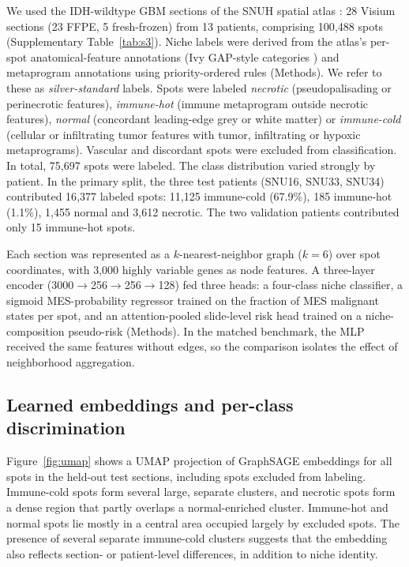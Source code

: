 \documentclass[11pt,letterpaper]{article}
\begin{document}
We used the IDH-wildtype GBM sections of the SNUH spatial atlas \cite{park2026}: 28 Visium sections (23 FFPE, 5 fresh-frozen) from 13 patients, comprising 100{,}488 spots (Supplementary Table~\ref{tab:s3}). Niche labels were derived from the atlas's per-spot anatomical-feature annotations (Ivy GAP-style categories \cite{puchalski2018}) and metaprogram annotations using priority-ordered rules (Methods). We refer to these as \emph{silver-standard} labels. Spots were labeled \emph{necrotic} (pseudopalisading or perinecrotic features), \emph{immune-hot} (immune metaprogram outside necrotic features), \emph{normal} (concordant leading-edge grey or white matter) or \emph{immune-cold} (cellular or infiltrating tumor features with tumor, infiltrating or hypoxic metaprograms). Vascular and discordant spots were excluded from classification. In total, 75{,}697 spots were labeled. The class distribution varied strongly by patient. In the primary split, the three test patients (SNU16, SNU33, SNU34) contributed 16{,}377 labeled spots: 11{,}125 immune-cold (67.9\%), 185 immune-hot (1.1\%), 1{,}455 normal and 3{,}612 necrotic. The two validation patients contributed only 15 immune-hot spots.

Each section was represented as a $k$-nearest-neighbor graph ($k = 6$) over spot coordinates, with 3{,}000 highly variable genes as node features. A three-layer encoder (3000$\rightarrow$256$\rightarrow$256$\rightarrow$128) fed three heads: a four-class niche classifier, a sigmoid MES-probability regressor trained on the fraction of MES malignant states per spot, and an attention-pooled slide-level risk head trained on a niche-composition pseudo-risk (Methods). In the matched benchmark, the MLP received the same features without edges, so the comparison isolates the effect of neighborhood aggregation.

\subsection{Learned embeddings and per-class discrimination}

Figure~\ref{fig:umap} shows a UMAP \cite{mcinnes2018} projection of GraphSAGE embeddings for all spots in the held-out test sections, including spots excluded from labeling. Immune-cold spots form several large, separate clusters, and necrotic spots form a dense region that partly overlaps a normal-enriched cluster. Immune-hot and normal spots lie mostly in a central area occupied largely by excluded spots. The presence of several separate immune-cold clusters suggests that the embedding also reflects section- or patient-level differences, in addition to niche identity.
\end{document}
